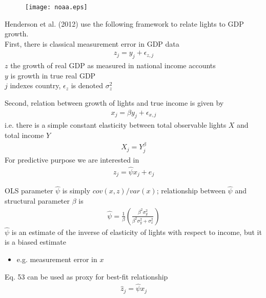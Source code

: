 \documentclass{beamer}
\begin{document}
\begin{frame}
  \begin{figure}
    \texttt{[image: noaa.eps]}
  \end{figure}
\end{frame}

\begin{frame}
  Henderson et al. (2012) use the following framework to relate lights to GDP growth.\\
  First, there is classical measurement error in GDP data
  \begin{align}
    z_j= y_j+\epsilon_{z,j}
  \end{align}
  $z$ the growth of real GDP as measured in national income accounts\\
  $y$ is growth in true real GDP\\
  $j$ indexes country, $\epsilon_z$ is denoted $\sigma^2_z$
\end{frame}

\begin{frame}
  Second, relation between growth of lights and true income is given by
  \begin{align}
    x_j=\beta y_j + \epsilon_{x,j}
  \end{align}
  \medskip
  i.e. there is a simple constant elasticity between total observable lights $X$ and total income $Y$
  \begin{align}
    X_j=Y_j^{\beta}
  \end{align}
  \medskip
  For predictive purpose we are interested in
  \begin{align}
    z_j=\hat{\psi} x_j + e_j
  \end{align}
\end{frame}

\begin{frame}
 OLS parameter $\hat{\psi}$ is simply $cov(x,z)/ var(x)$; relationship between $\hat{\psi}$ and structural parameter $\beta$ is
 \begin{align}
   \hat{\psi} = \frac{1}{\beta} \left( \frac{\beta^2 \sigma^2_y}{\beta^2 \sigma^2_y + \sigma^2_x}     \right)
 \end{align}
 \medskip
 $\hat{\psi}$ is an estimate of the inverse of elasticity of lights with respect to income, but it is a biased estimate
 \begin{itemize}
   \item e.g. measurement error in $x$
 \end{itemize}
 Eq. 53 can be used as proxy for best-fit relationship
 \begin{align}
   \hat{z}_j=\hat{\psi}x_j
 \end{align}  
\end{frame}
\end{document}
